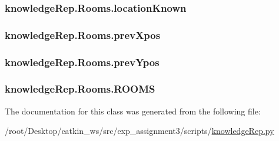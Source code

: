\subsubsection[{\texorpdfstring{location\+Known}{locationKnown}}]{\setlength{\rightskip}{0pt plus 5cm}knowledge\+Rep.\+Rooms.\+location\+Known}\hypertarget{classknowledgeRep_1_1Rooms_ab43e8f7de2083bf7da36585822931688}{}\label{classknowledgeRep_1_1Rooms_ab43e8f7de2083bf7da36585822931688}
\subsubsection[{\texorpdfstring{prev\+Xpos}{prevXpos}}]{\setlength{\rightskip}{0pt plus 5cm}knowledge\+Rep.\+Rooms.\+prev\+Xpos}\hypertarget{classknowledgeRep_1_1Rooms_a41d3fe644e24332f8d5ce1ea1fd3d036}{}\label{classknowledgeRep_1_1Rooms_a41d3fe644e24332f8d5ce1ea1fd3d036}
\subsubsection[{\texorpdfstring{prev\+Ypos}{prevYpos}}]{\setlength{\rightskip}{0pt plus 5cm}knowledge\+Rep.\+Rooms.\+prev\+Ypos}\hypertarget{classknowledgeRep_1_1Rooms_abca079e9384306484df7407762e2c1cc}{}\label{classknowledgeRep_1_1Rooms_abca079e9384306484df7407762e2c1cc}
\subsubsection[{\texorpdfstring{R\+O\+O\+MS}{ROOMS}}]{\setlength{\rightskip}{0pt plus 5cm}knowledge\+Rep.\+Rooms.\+R\+O\+O\+MS}\hypertarget{classknowledgeRep_1_1Rooms_ae173d3ce96883c1e1cbcd3c67e045605}{}\label{classknowledgeRep_1_1Rooms_ae173d3ce96883c1e1cbcd3c67e045605}


The documentation for this class was generated from the following file\+:\begin{DoxyCompactItemize}
\item 
/root/\+Desktop/catkin\+\_\+ws/src/exp\+\_\+assignment3/scripts/\hyperlink{knowledgeRep_8py}{knowledge\+Rep.\+py}\end{DoxyCompactItemize}

